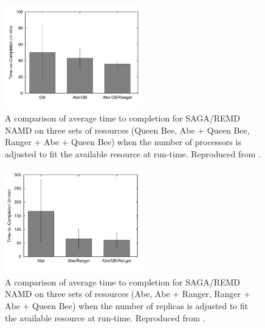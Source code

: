\documentclass[a4paper,10pt,twocolumn]{article}
\begin{document}
\begin{figure}
\centering	
\includegraphics[width=6cm]{namd-rep-size-adaptive}
\caption{A comparison of average time to completion for SAGA/REMD NAMD on three sets of resources (Queen Bee, Abe + Queen Bee, Ranger + Abe + Queen Bee) when the number of processors is adjusted to fit the available resource at run-time.  Reproduced from \cite{ref:saganamd}.}
\end{figure}

\begin{figure}
\centering	
\includegraphics[width=6cm]{namd-rep-num-adaptive}
\caption{A comparison of average time to completion for SAGA/REMD NAMD on three sets of resources (Abe, Abe + Ranger, Ranger + Abe + Queen Bee) when the number of replicas is adjusted to fit the available resource at run-time.  Reproduced from \cite{ref:saganamd}.}
\end{figure}
\end{document}
